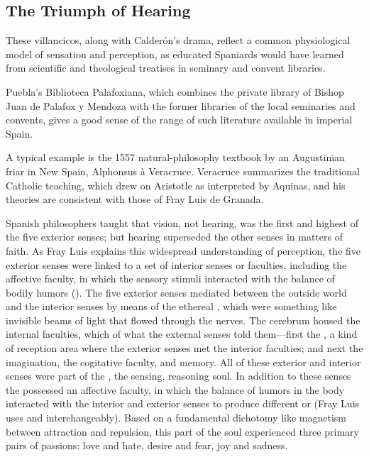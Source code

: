 
\subsection{The Triumph of Hearing}

These villancicos, along with Calderón's drama, reflect a common physiological
model of sensation and perception, as educated Spaniards would have learned
from scientific and theological treatises in seminary and convent libraries.%
\begin{Footnote}
    Puebla's Biblioteca Palafoxiana, which combines the private library of Bishop
    Juan de Palafox y Mendoza with the former libraries of the local seminaries
    and convents, gives a good sense of the range of such literature available
    in imperial Spain.
\end{Footnote}
A typical example is the 1557 natural-philosophy textbook  by an Augustinian friar in New Spain, Alphonsus à Veracruce.%
    \Autocite{Veracruce:Phisica}
Veracruce summarizes the traditional Catholic teaching, which drew on Aristotle
as interpreted by Aquinas, and his theories are consistent with those of Fray
Luis de Granada.


Spanish philosophers taught that vision, not hearing, was the first and highest
of the five exterior senses; but hearing superseded the other senses in matters
of faith.
As Fray Luis explains this widespread understanding of perception, the five
exterior senses were linked to a set of interior senses or faculties, including
the affective faculty, in which the sensory stimuli interacted with the balance
of bodily humors ().%
    \Autocite
    [, ]
    {LuisdeGranada-Balcells:SimboloPtI}
The five exterior senses mediated between the outside world and the interior
senses by means of the ethereal , which were something
like invisible beams of light that flowed through the nerves.  
The cerebrum housed the internal faculties, which  of what
the external senses told them---first the , a kind of
reception area where the exterior senses met the interior faculties; and next
the imagination, the cogitative faculty, and memory.
All of these exterior and interior senses were part of the , the sensing, reasoning soul.
In addition to these senses the  possessed an affective
faculty, in which the balance of humors in the body interacted with the interior
and exterior senses to produce different  or 
(Fray Luis uses  and  interchangeably).
Based on a fundamental dichotomy like magnetism between attraction and
repulsion, this  part of the soul experienced three
primary pairs of passions: love and hate, desire and fear, joy and sadness.

